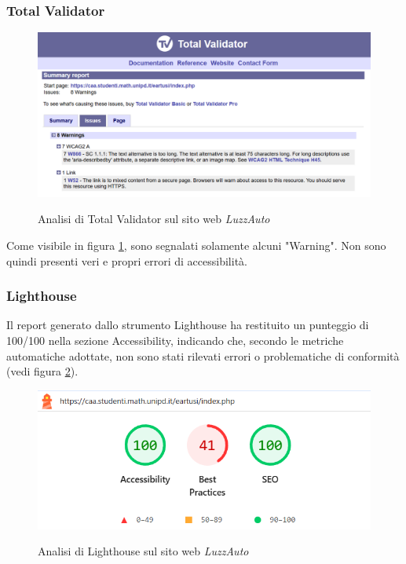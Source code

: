 \subsubsection{Total Validator}
\begin{figure}[H]
    \centering
    \includegraphics[width=0.8\linewidth, alt={Screenshot dell'analisi di Total Validator sul sito web LuzzAuto}]{img/TV_luzzauto.png}
    \caption{Analisi di Total Validator sul sito web \textit{LuzzAuto}}\label{fig:TV_luzzauto}
\end{figure}

\noindent Come visibile in figura \ref{fig:TV_luzzauto}, sono segnalati solamente alcuni "Warning". Non sono quindi presenti veri e propri errori di accessibilità.

\subsubsection{Lighthouse}
\noindent Il report generato dallo strumento Lighthouse ha restituito un punteggio di 100/100 nella sezione Accessibility, indicando che, secondo le metriche automatiche adottate, non sono stati rilevati errori o problematiche di conformità (vedi figura \ref{fig:Lighthouse_luzzauto}).
\begin{figure}[H]
    \centering
    \includegraphics[width=0.6\linewidth, alt={Screenshot dell'analisi di Lighthouse sul sito web LuzzAuto}]{img/Lighthouse_luzzauto.png}
    \caption{Analisi di Lighthouse sul sito web \textit{LuzzAuto}}\label{fig:Lighthouse_luzzauto}
\end{figure}

